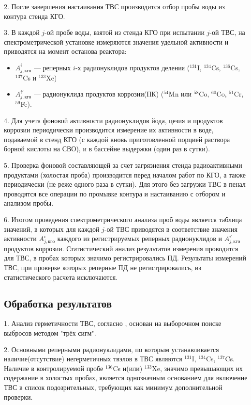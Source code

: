 2. После завершения настаивания ТВС производится отбор пробы воды из контура стенда КГО.

3. В каждой $j$-ой пробе воды, взятой из стенда КГО при испытании $j$-ой ТВС, на спектрометрической установке измеряются значения удельной активности и приводятся на момент останова реактора:
\begin{itemize}
\item $A_{j,кго}^{i}$ --- реперных $i$-х радионуклидов продуктов деления ($^{131}$I, $^{134}$Cs, $^{136}$Cs, $^{137}$Cs и $^{133}$Xe)

\item $A_{j,кго}^{i'}$ --- радионуклида продуктов коррозии(ПК) ($^{54}$Mn или $^{58}$Co, $^{60}$Co, $^{51}$Cr, $^{59}$Fe).
\end{itemize}

4. Для учета фоновой активности радионуклидов йода, цезия и
продуктов коррозии периодически производится измерение их активности
в воде, подаваемой в стенд КГО (с каждой вновь приготовленной порцией
раствора борной кислоты на СВО), и в бассейне выдержки (один раз в
сутки).

5. Проверка фоновой составляющей за счет загрязнения стенда
радиоактивными продуктами (холостая проба) производится перед началом
работ по КГО, а также периодически (не реже одного раза в сутки). Для этого
без загрузки ТВС в пенал проводятся все операции по промывке контура и
настаиванию с отбором и анализом пробы.

6. Итогом проведения спектрометрического анализа проб воды является
таблица значений, в которых для каждой $j$-ой ТВС приводятся в соответствие
значения активности $A_{j,кго}^{i}$ каждого из регистрируемых реперных радионуклидов
и $A_{j,кго}^{i'}$ продуктов коррозии. Статистический анализ результатов
измерения проводится для ТВС, в пробах которых значимо регистрировались
ПД. Результаты измерений ТВС, при проверке которых реперные ПД не
регистрировались, из статистического расчета исключаются.

\subsection{Обработка результатов}
1. Анализ герметичности ТВС, согласно \cite{RD}, основан на выборочном поиске выбросов методом "трёх сигм".

2. Основными реперными радионуклидами, по которым устанавливается наличие(отсутствие) негерметичных твэлов в ТВС являются $^{131}$I, $^{134}$Cs, $^{137}$Cs. Наличие в контролируемой пробе $^{136}$Cs и(или) $^{133}$Xe, значимо превышающих их содержание в холостых пробах, является однозначным основанием для включение ТВС в список подозрительных, требующих как минимум дополнительной проверки.

